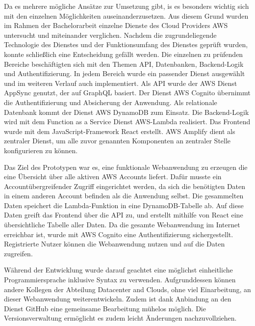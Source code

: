 Da es mehrere mögliche Ansätze zur Umsetzung gibt, is es besonders wichtig sich mit den einzelnen Möglichkeiten auseinanderzusetzen.
Aus diesem Grund wurden im Rahmen der Bachelorarbeit einzelne Dienste des Cloud Providers AWS untersucht und miteinander verglichen.
Nachdem die zugrundeliegende Technologie des Dienstes und der Funktionsumfang des Dienstes geprüft wurden, konnte schließlich eine Entscheidung gefällt werden.
Die einzelnen zu prüfenden Bereiche beschäftigten sich mit den Themen API, Datenbanken, Backend-Logik und Authentifizierung.
In jedem Bereich wurde ein passender Dienst ausgewählt und im weiteren Verlauf auch implementiert.
Als API wurde der AWS Dienst AppSync genutzt, der auf GraphQL basiert.
Der Dienst AWS Cognito übernimmt die Authentifizierung und Absicherung der Anwendung.
Als relationale Datenbank kommt der Dienst AWS DynamoDB zum Einsatz.
Die Backend-Logik wird mit dem Function as a Service Dienst AWS-Lambda realisiert.
Das Frontend wurde mit dem JavaScript-Framework React erstellt.
AWS Amplify dient als zentraler Dienst, um alle zuvor genannten Komponenten an zentraler Stelle konfigurieren zu können.

Das Ziel des Prototypen war es, eine funktionale Webanwendung zu erzeugen die eine Übersicht über alle aktiven AWS Accounts liefert.
Dafür musste ein Accountübergreifender Zugriff eingerichtet werden, da sich die benötigten Daten in einem anderen Account befinden als die Anwendung selbst.
Die gesammelten Daten speichert die Lambda-Funktion in eine DynamoDB-Tabelle ab.
Auf diese Daten greift das Frontend über die API zu, und erstellt mithilfe von React eine übersichtliche Tabelle aller Daten.
Da die gesamte Webanwendung im Internet erreichbar ist, wurde mit AWS Cognito eine Authentifizierung sichergestellt.
Registrierte Nutzer können die Webanwendung nutzen und auf die Daten zugreifen.

Während der Entwicklung wurde darauf geachtet eine möglichst einheitliche Programmiersprache inklusive Syntax zu verwenden.
Aufgrunddessen können andere Kollegen der Abteilung Datacenter and Clouds, ohne viel Einarbeitung, an dieser Webanwendung weiterentwickeln.
Zudem ist dank Anbindung an den Dienst GitHub eine gemeinsame Bearbeitung mühelos möglich.
Die Versionsverwaltung ermöglicht es zudem leicht Änderungen nachzuvollziehen.







